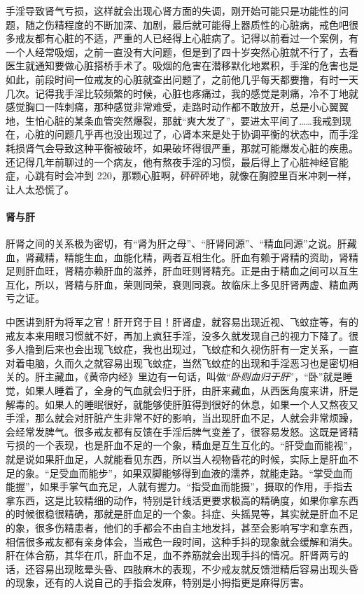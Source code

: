 手淫导致肾气亏损，这样就会出现心肾方面的失调，刚开始可能只是功能性的问题，随之伤精程度的不断加深、加剧，最后就可能得上器质性的心脏病，戒色吧很多戒友都有心脏的不适，严重的人已经得上心脏病了。记得以前看过一个案例，有一个人经常吸烟，之前一直没有大问题，但是到了四十岁突然心脏就不行了，去看医生就通知要做心脏搭桥手术了。吸烟的危害在潜移默化地累积，手淫的危害也是如此，前段时间一位戒友的心脏就查出问题了，之前他几乎每天都要撸，有时一天几次。记得我手淫比较频繁的时候，心脏也疼痛过，我的感觉是刺痛，冷不丁地就感觉胸口一阵刺痛，那种感觉非常难受，走路时动作都不敢放开，总是小心翼翼地，生怕心脏的某条血管突然爆裂，那就“爽大发了”，要进太平间了……我戒到现在，心脏的问题几乎再也没出现过了，心肾本来是处于协调平衡的状态中，而手淫耗损肾气会导致这种平衡被破坏，如果破坏得很严重，那就可能爆发心脏的疾患。还记得几年前聊过的一个病友，他有熬夜手淫的习惯，最后得上了心脏神经官能症，心跳有时会冲到 220，那颗心脏啊，砰砰砰地，就像在胸腔里百米冲刺一样，让人太恐慌了。

\paragraph{肾与肝}

肝肾之间的关系极为密切，有“肾为肝之母”、“肝肾同源”、“精血同源”之说。肝藏血，肾藏精，精能生血，血能化精，两者互相生化。肝血有赖于肾精的资助，肾精足则肝血旺，肾精亦赖肝血的滋养，肝血旺则肾精充。正是由于精血之间可以互生互化，所以，肾精与肝血，荣则同荣，衰则同衰。故临床上多见肝肾两虚、精血两亏之证。

中医讲到肝为将军之官！肝开窍于目！肝肾虚，就容易出现近视、飞蚊症等，有的戒友本来用眼习惯就不好，再加上疯狂手淫，没多久就发现自己的视力下降了。很多人撸到后来也会出现飞蚊症，我也出现过，飞蚊症和久视伤肝有一定关系，一直对着电脑，久而久之就容易出现飞蚊症，当然飞蚊症的出现和手淫恶习也是密切相关的。肝主藏血，《黄帝内经》里边有一句话，叫做“\textit{卧则血归于肝}”，“卧”就是睡觉，如果人睡着了，全身的气血就会归于肝，由肝来藏血，从西医角度来讲，肝是解毒的。如果人的睡眠很好，就能够使肝脏得到很好的休息，如果一个人又熬夜又手淫，那么就会对肝脏产生非常不好的影响，当出现肝血不足，人就会非常烦躁，会经常发脾气。很多戒友都有反馈在手淫后脾气变差了，很容易发怒。这既是肾精亏损的一个表现，也是肝血不足的一个象，精血是互生互化的。“肝受血而能视”，就是说如果肝血足，人就能看见东西，所以当人视物昏花的时候，实际上是肝血不足的象。“足受血而能步”，如果双脚能够得到血液的濡养，就能走路。“掌受血而能握”，如果手掌气血充足，人就有握力。“指受血而能摄”，摄取的作用，手指去拿东西，这是比较精细的动作，特别是针线活更要求极高的精确度，如果你拿东西的时候很稳很精确，那就是肝血足的一个象。抖症、头摇晃等，其实就是肝血不足的象，很多伤精患者，他们的手都会不由自主地发抖，甚至会影响写字和拿东西，相信很多戒友都有亲身体会，当戒色一段时间，这种手抖的现象就会缓解和消失。肝在体合筋，其华在爪，肝血不足，血不养筋就会出现手抖的情况。肝肾两亏的话，还容易出现眩晕头昏、四肢麻木的表现，不少戒友就反馈泄精后容易出现头昏的现象，还有的人说自己的手指会发麻，特别是小拇指更是麻得厉害。

